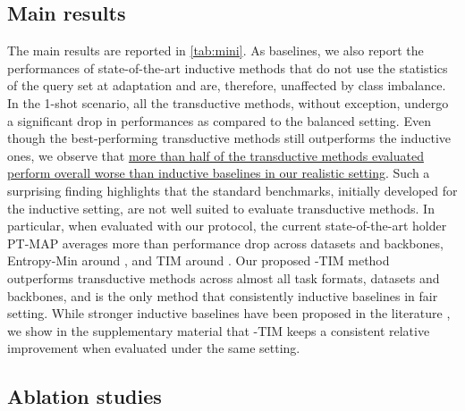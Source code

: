     \subsection{Main results}
        
        The main results are reported in \autoref{tab:mini}. As baselines, we also report the performances of state-of-the-art inductive methods that do not use the statistics of the 
        query set at adaptation and are, therefore, unaffected by class imbalance. In the 1-shot scenario, all the transductive methods, without exception, undergo a significant drop in performances as compared to the balanced setting. Even though the best-performing transductive methods still outperforms the inductive ones, we observe that 
        \ul{more than half of the transductive methods evaluated perform overall worse than inductive baselines in our realistic setting}. 
        Such a surprising finding highlights that the standard benchmarks, initially developed for the inductive setting, are not well suited to evaluate transductive methods. 
        In particular, when evaluated with our protocol, the current state-of-the-art holder PT-MAP averages more than  performance drop across datasets and backbones, Entropy-Min 
        around , and TIM around . Our proposed -TIM method outperforms transductive methods across almost all task formats, datasets and backbones, and is the only method that consistently inductive baselines in fair setting. While stronger inductive baselines have been proposed in the literature \cite{zhang2020deepemd}, we show in the supplementary material that -TIM keeps a consistent relative improvement when evaluated under the same setting.

    \subsection{Ablation studies}

